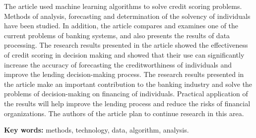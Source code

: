 The article used machine learning algorithms to solve credit scoring
problems. Methods of analysis, forecasting and determination of the
solvency of individuals have been studied. In addition, the article
compares and examines one of the current problems of banking systems,
and also presents the results of data processing. The research results
presented in the article showed the effectiveness of credit scoring in
decision making and showed that their use can significantly increase the
accuracy of forecasting the creditworthiness of individuals and improve
the lending decision-making process. The research results presented in
the article make an important contribution to the banking industry and
solve the problems of decision-making on financing of individuals.
Practical application of the results will help improve the lending
process and reduce the risks of financial organizations. The authors of
the article plan to continue research in this area.

{\bfseries Key words:} methods, technology, data, algorithm, analysis.


